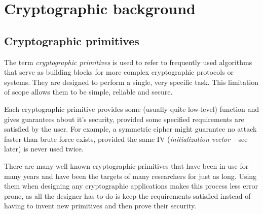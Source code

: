


\chapter{Cryptographic background}


\section{Cryptographic primitives}

The term \emph{cryptographic primitives} is used to refer to frequently used algorithms that serve as building blocks for more complex cryptographic protocols or systems.
They are designed to perform a single, very specific task.
This limitation of scope allows them to be simple, reliable and secure.

Each cryptographic primitive provides some (usually quite low-level) function and gives guarantees about it's security, provided some specified requirements are satisfied by the user. 
For example, a symmetric cipher might guarantee no attack faster than brute force exists, provided the same IV (\emph{initialization vector} -- see later) is never used twice.

There are many well known cryptographic primitives that have been in use for many years and have been the targets of many researchers for just as long.
Using them when designing any cryptographic applications makes this process less error prone, as all the designer has to do is keep the requirements satisfied instead of having to invent new primitives and then prove their security.

